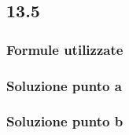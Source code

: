 \documentclass[../../main.tex]{subfiles}
\begin{document}
\subsection*{13.5}
\subsubsection*{Formule utilizzate}
\subsubsection*{Soluzione punto a}
\subsubsection*{Soluzione punto b}
\newpage
\end{document}
